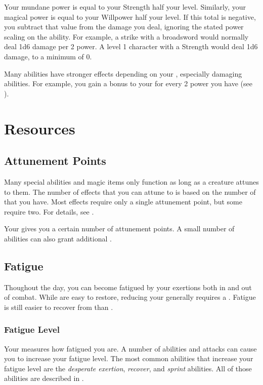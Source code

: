         Your mundane power is equal to your Strength \add half your level.
        Similarly, your magical power is equal to your Willpower \add half your level.
        If this total is negative, you subtract that value from the damage you deal, ignoring the stated power scaling on the ability.
        For example, a strike with a broadsword would normally deal 1d6 damage  per 2 power.
        A level 1 character with a  Strength would deal 1d6  damage, to a minimum of 0.

        Many abilities have stronger effects depending on your , especially damaging abilities.
        For example, you gain a  bonus to your  for every 2 power you have (see ).

\section{Resources}\label{Resources}

    \subsection{Attunement Points}\label{Attunement Points}
        Many special abilities and magic items only function as long as a creature attunes to them.
        The number of effects that you can attune to is based on the number of  that you have.
        Most effects require only a single attunement point, but some require two.
        For details, see .

        Your  gives you a certain number of attunement points.
        A small number of abilities can also grant additional .

    \subsection{Fatigue}\label{Fatigue}
        Thoughout the day, you can become fatigued by your exertions both in and out of combat.
        While  are easy to restore, reducing your  generally requires a .
        Fatigue is still easier to recover from than .

        \subsubsection{Fatigue Level}\label{Fatigue Level}
            Your  measures how fatigued you are.
            A number of abilities and attacks can cause you to increase your fatigue level.
            The most common abilities that increase your fatigue level are the \textit{desperate exertion}, \textit{recover}, and \textit{sprint} abilities.
            All of those abilities are described in .

